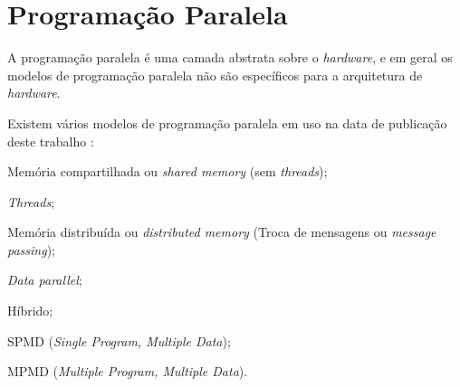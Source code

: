 
\section{Programação Paralela}

A programação paralela é uma camada abstrata sobre o \textit{hardware}, e em 
geral os modelos de programação paralela não são específicos para a arquitetura
de \textit{hardware}.

Existem vários modelos de programação paralela em uso na data de publicação
deste trabalho \cite{aapc}:

\begin{alineas}
        \item Memória compartilhada ou \textit{shared memory} (sem
                        \textit{threads});
        \item \textit{Threads};
        \item Memória distribuída ou \textit{distributed memory} (Troca de
                        mensagens ou \textit{message passing});
        \item \textit{Data parallel};
        \item Híbrido;
        \item SPMD (\textit{Single Program, Multiple Data});
        \item MPMD (\textit{Multiple Program, Multiple Data}).
\end{alineas}



